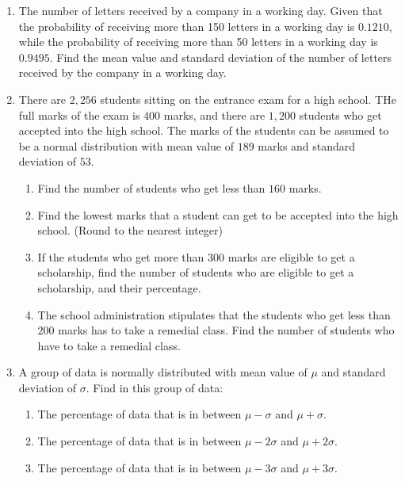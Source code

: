 \documentclass{report}
\begin{document}
\begin{multicols}{2}
\begin{enumerate}
    \item The number of letters received by a company in a working day. Given that the
          probability of receiving more than 150 letters in a working day is $0.1210$,
          while the probability of receiving more than 50 letters in a working day is
          $0.9495$. Find the mean value and standard deviation of the number of letters
          received by the company in a working day.

    \item There are $2,256$ students sitting on the entrance exam for a high school. THe
          full marks of the exam is $400$ marks, and there are $1,200$ students who get
          accepted into the high school. The marks of the students can be assumed to be a
          normal distribution with mean value of $189$ marks and standard deviation of
          $53$.
          \begin{enumerate}
            \item Find the number of students who get less than $160$ marks.
            \item Find the lowest marks that a student can get to be accepted into the high
                  school. (Round to the nearest integer)
            \item If the students who get more than $300$ marks are eligible to get a
                  scholarship, find the number of students who are eligible to get a scholarship,
                  and their percentage.
            \item The school administration stipulates that the students who get less than $200$
                  marks has to take a remedial class. Find the number of students who have to
                  take a remedial class.
          \end{enumerate}

    \item A group of data is normally distributed with mean value of $\mu$ and standard
          deviation of $\sigma$. Find in this group of data:
          \begin{enumerate}
            \item The percentage of data that is in between $\mu - \sigma$ and $\mu + \sigma$.
            \item The percentage of data that is in between $\mu - 2\sigma$ and $\mu + 2\sigma$.
            \item The percentage of data that is in between $\mu - 3\sigma$ and $\mu + 3\sigma$.
          \end{enumerate}
  \end{enumerate}


\end{multicols}
\end{document}
